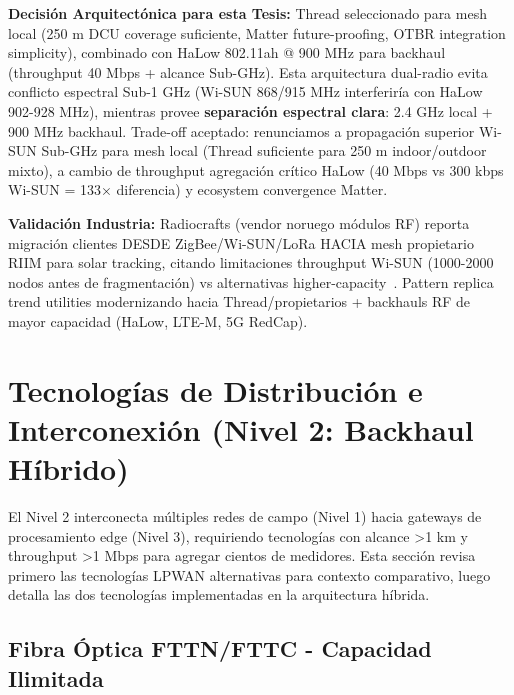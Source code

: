 \textbf{Decisión Arquitectónica para esta Tesis:} Thread seleccionado para mesh local (250 m DCU coverage suficiente, Matter future-proofing, OTBR integration simplicity), combinado con HaLow 802.11ah @ 900 MHz para backhaul (throughput 40 Mbps + alcance Sub-GHz). Esta arquitectura dual-radio evita conflicto espectral Sub-1 GHz (Wi-SUN 868/915 MHz interferiría con HaLow 902-928 MHz), mientras provee \textbf{separación espectral clara}: 2.4 GHz local + 900 MHz backhaul. Trade-off aceptado: renunciamos a propagación superior Wi-SUN Sub-GHz para mesh local (Thread suficiente para 250 m indoor/outdoor mixto), a cambio de throughput agregación crítico HaLow (40 Mbps vs 300 kbps Wi-SUN = 133$\times$ diferencia) y ecosystem convergence Matter.

\textbf{Validación Industria:} Radiocrafts (vendor noruego módulos RF) reporta migración clientes DESDE ZigBee/Wi-SUN/LoRa HACIA mesh propietario RIIM para solar tracking, citando limitaciones throughput Wi-SUN (1000-2000 nodos antes de fragmentación) vs alternativas higher-capacity~\cite{radiocraftsCommissioningLargeSolar2025}. Pattern replica trend utilities modernizando hacia Thread/propietarios + backhauls RF de mayor capacidad (HaLow, LTE-M, 5G RedCap).

\section{Tecnologías de Distribución e Interconexión (Nivel 2: Backhaul Híbrido)}

El Nivel 2 interconecta múltiples redes de campo (Nivel 1) hacia gateways de procesamiento edge (Nivel 3), requiriendo tecnologías con alcance >1 km y throughput >1 Mbps para agregar cientos de medidores. Esta sección revisa primero las tecnologías LPWAN alternativas para contexto comparativo, luego detalla las dos tecnologías implementadas en la arquitectura híbrida.




\subsection{Fibra Óptica FTTN/FTTC - Capacidad Ilimitada}

